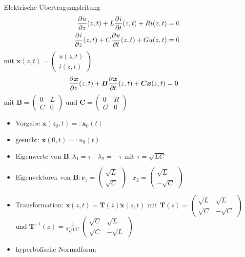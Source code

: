 \begin{bsp}{Elektrische Übertragungsleitung}
\begin{align*}
\frac{\partial^{} u}{\partial z}(z,t)+L\frac{\partial^{} i}{\partial t}(z,t)+Ri(z,t)&=0 \\
\frac{\partial^{} i}{\partial z}(z,t)+C\frac{\partial^{} u}{\partial t}(z,t)+Gu(z,t)&=0
\end{align*}
mit $\bm{x}(z,t)=\begin{pmatrix}
u(z,t) \\ i(z,t)
\end{pmatrix}$
\begin{align*}
\frac{\partial^{} \bm{x}}{\partial z}(z,t)+\bm{B}\frac{\partial^{} \bm{x}}{\partial t}(z,t)+\bm{C}\bm{x}(z,t)&=0
\end{align*}
mit $\bm{B}=\begin{pmatrix}
0 & L \\ C & 0
\end{pmatrix}$ und $\bm{C}=\begin{pmatrix}
0 & R \\ G & 0
\end{pmatrix}$
\begin{itemize}
\item[] Vorgabe $\bm{x}(z_0,t) =:\bm{x}_0(t)$
\item[] gesucht: $\bm{x}(0,t) =: u_0(t)$
\item[] Eigenwerte von $\bm{B}:\lambda_1 = \tau \quad \lambda_2 = -\tau$ mit $\tau = \sqrt{LC}$
\item[] Eigenvektoren von $\bm{B}:\bm{r}_1 = \begin{pmatrix}\sqrt{L} \\ \sqrt{C}\end{pmatrix} \quad \bm{r}_2 = \begin{pmatrix}\sqrt{L} \\ -\sqrt{C}\end{pmatrix} $
\item[] Transformation: $\bm{x}(z,t)=\bm{T}(z)\tilde{\bm{x}}(z,t)$ \newline mit  $\bm{T}(z) = \begin{pmatrix}\sqrt{L} &\sqrt{L} \\ \sqrt{C}&-\sqrt{C}\end{pmatrix}$ und $\bm{T}^{-1}(z) =\frac{1}{2\sqrt{LC}} \begin{pmatrix}\sqrt{C} &\sqrt{L} \\ \sqrt{C} &-\sqrt{L}\end{pmatrix}$
\item[] hyperbolische Normalform: \[ \]
\end{itemize}

\end{bsp}